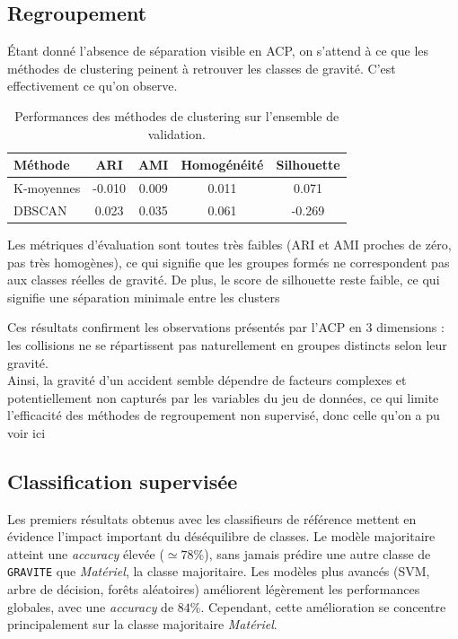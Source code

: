 \documentclass[11pt]{article}
\begin{document}
\subsection{Regroupement}
 Étant donné l'absence de séparation visible en ACP, on s'attend à ce que les méthodes de clustering peinent à retrouver les classes de gravité. C'est effectivement ce qu'on observe.\\

\begin{table}[h]
\centering
\begin{tabular}{lcccc}
\hline
Méthode & ARI & AMI & Homogénéité & Silhouette \\
\hline
K-moyennes & -0.010 & 0.009 & 0.011 &  0.071 \\
DBSCAN     &  0.023 & 0.035 & 0.061 & -0.269 \\
\hline
\end{tabular}
\caption{Performances des méthodes de clustering sur l'ensemble de validation.}
\label{tab:clustering}
\end{table}

Les métriques d’évaluation sont toutes très faibles (ARI et AMI proches de zéro, pas très homogènes), ce qui signifie que les groupes formés ne correspondent pas aux classes réelles de gravité. De plus, le score de silhouette reste faible, ce qui signifie une séparation minimale entre les clusters



Ces résultats confirment les observations présentés par l’ACP en 3 dimensions : les collisions ne se répartissent pas naturellement en groupes distincts selon leur gravité.
\\
Ainsi, la gravité d’un accident semble dépendre de facteurs complexes et potentiellement non capturés par les variables du jeu de données, ce qui limite l’efficacité des méthodes de regroupement non supervisé, donc celle qu'on a pu voir ici
 
\subsection{Classification supervisée}
Les premiers résultats obtenus avec les classifieurs de référence mettent en évidence l’impact important du déséquilibre de classes. Le modèle majoritaire atteint une \textit{accuracy} élevée ($\simeq78\%$), sans jamais prédire une autre classe de \texttt{GRAVITE} que \textit{Matériel}, la classe majoritaire.
Les modèles plus avancés (SVM, arbre de décision, forêts aléatoires) améliorent légèrement les performances globales, avec une \textit{accuracy} de $84\%$. Cependant, cette amélioration se concentre principalement sur la classe majoritaire \textit{Matériel}.
\end{document}
